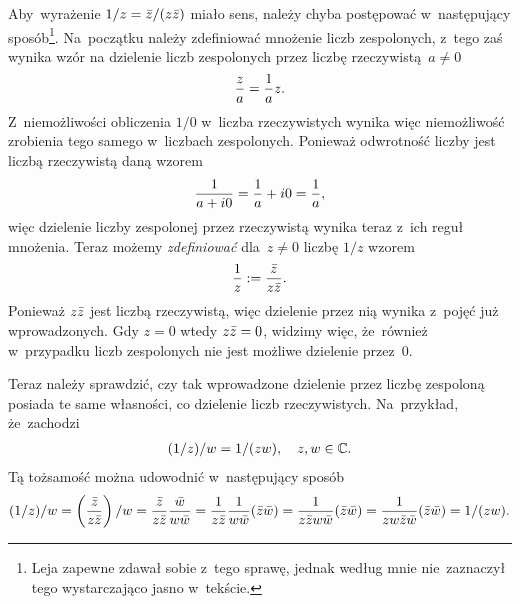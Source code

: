 \documentclass[a4paper,11pt]{article}
\begin{document}
\start {} Aby~wyrażenie $1 / z = \bar{ z } / ( z \bar{ z } )$ miało
sens, należy chyba postępować w~następujący sposób\footnote{Leja
  zapewne zdawał sobie z~tego sprawę, jednak według mnie nie~zaznaczył
  tego wystarczająco jasno w~tekście.}. Na~początku należy zdefiniować
mnożenie liczb zespolonych, z~tego zaś wynika wzór na dzielenie liczb
zespolonych przez liczbę rzeczywistą~$a \neq 0$
\begin{equation}
  \label{eq:Leja-1}
  \begin{split}
    \frac{ z }{ a } = \frac{ 1 }{  a  } z.
  \end{split}
\end{equation}
Z~niemożliwości obliczenia $1 / 0$ w~liczba rzeczywistych wynika więc
niemożliwość zrobienia tego samego w~liczbach zespolonych. Ponieważ
odwrotność liczby jest liczbą rzeczywistą daną wzorem
\begin{equation}
  \label{eq:Leja-2}
  \begin{split}
    \frac{ 1 }{  a + i0  } = \frac{ 1 }{  a  } + i0 = \frac{ 1 }{  a  },
  \end{split}
\end{equation}
więc dzielenie liczby zespolonej przez rzeczywistą wynika teraz z~ich
reguł mnożenia. Teraz możemy \emph{zdefiniować} dla~$z \neq 0$ liczbę
$1 / z$ wzorem
\begin{equation}
  \label{eq:Leja-3}
  \begin{split}
    \frac{ 1 }{  z  } := \frac{ \bar{ z } }{ z \bar{ z } }.
  \end{split}
\end{equation}
Ponieważ $z \bar{ z }$ jest liczbą rzeczywistą, więc dzielenie przez nią
wynika z~pojęć już wprowadzonych. Gdy $z = 0$ wtedy $z \bar{ z } = 0$,
widzimy więc, że~również w~przypadku liczb zespolonych nie jest
możliwe dzielenie przez~0.

Teraz należy sprawdzić, czy tak wprowadzone dzielenie przez liczbę
zespoloną posiada te same własności, co dzielenie liczb rzeczywistych.
Na~przykład, że~zachodzi
\begin{equation}
  \label{eq:Leja-4}
  \begin{split}
    ( 1 / z ) / w = 1 / ( z w ), \quad z, w \in \mathbb{C}.
  \end{split}
\end{equation}
Tą tożsamość można udowodnić w~następujący sposób
\begin{equation}
  \label{eq:Leja-5}
  \begin{split}
    ( 1 / z ) / w = \left( \frac{ \bar{ z } }{ z \bar{ z } } \right) / w = \frac{
      \bar{ z } }{ z \bar{ z } } \frac{ \bar{ w } }{ w \bar{ w } } = \frac{ 1 }{  z \bar{ z }  }
    \frac{ 1 }{  w \bar{ w }  } ( \bar{ z } \bar{ w } ) = \frac{ 1 }{  z \bar{ z } w \bar{ w }  } (
    \bar{ z } \bar{ w } ) = \frac{ 1 }{  z w \bar{ z } \bar{ w }  } ( \bar{ z } \bar{ w } ) = 1 / (
    z w ).
  \end{split}
\end{equation}
\end{document}
